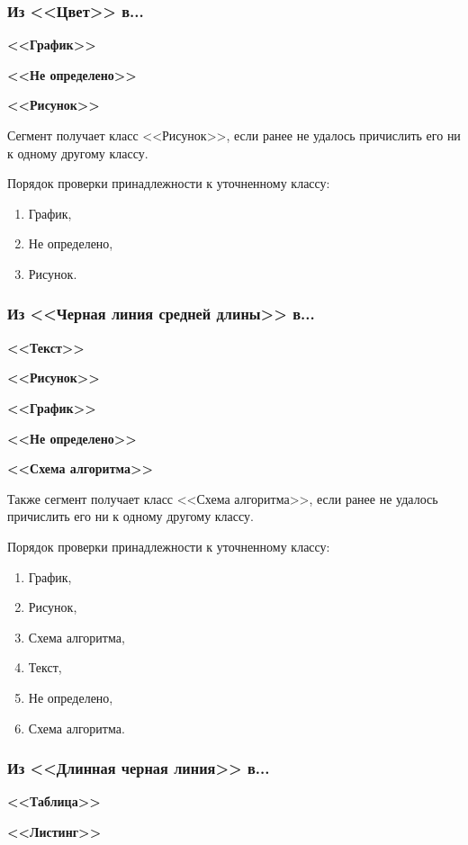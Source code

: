\subsubsection*{Из <<Цвет>> в...}

\textbf{<<График>>}

\textbf{<<Не определено>>}

\textbf{<<Рисунок>>}

Сегмент получает класс <<Рисунок>>, если ранее не удалось причислить его ни к одному другому классу.

Порядок проверки принадлежности к уточненному классу:
\begin{enumerate}
    \item График,
    \item Не определено,
    \item Рисунок.
\end{enumerate}

\subsubsection*{Из <<Черная линия средней длины>> в...}

\textbf{<<Текст>>}

\textbf{<<Рисунок>>}

\textbf{<<График>>}

\textbf{<<Не определено>>}

\textbf{<<Схема алгоритма>>}

Также сегмент получает класс <<Схема алгоритма>>, если ранее не удалось причислить его ни к одному другому классу.

Порядок проверки принадлежности к уточненному классу:
\begin{enumerate}
    \item График,
    \item Рисунок,
    \item Схема алгоритма,
    \item Текст,
    \item Не определено,
    \item Схема алгоритма.
\end{enumerate}

\subsubsection*{Из <<Длинная черная линия>> в...}

\textbf{<<Таблица>>}

\textbf{<<Листинг>>}

